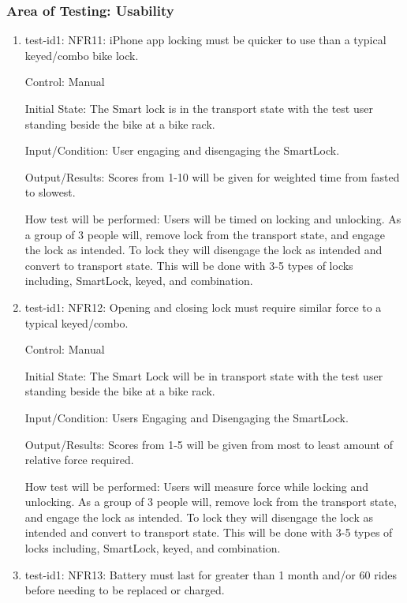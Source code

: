 \documentclass[12pt, titlepage]{article}
\begin{document}
\subsubsection{Area of Testing: Usability}

\begin{enumerate}

\item{test-id1: NFR11: iPhone app locking must be quicker to use than a typical keyed/combo bike lock.  \\}

Control: Manual 

Initial State: The Smart lock is in the transport state with the test user standing beside the bike at a bike rack.

Input/Condition: User engaging and disengaging the SmartLock.

Output/Results: Scores from 1-10 will be given for weighted time from fasted to slowest.

How test will be performed: Users will be timed on locking and unlocking. As a group of 3 people will, remove lock from the transport state, and engage the lock as intended. To lock they will disengage the lock as intended and convert to transport state. This will be done with 3-5 types of locks including, SmartLock, keyed, and combination.

\item{test-id1: NFR12: Opening and closing lock must require similar force to a typical keyed/combo.  \\}

Control: Manual 

Initial State: The Smart Lock will be in transport state with the test user standing beside the bike at a bike rack.

Input/Condition: Users Engaging and Disengaging the SmartLock.

Output/Results: Scores from 1-5 will be given from most to least amount of relative force required.

How test will be performed: Users will measure force while locking and unlocking. As a group of 3 people will, remove lock from the transport state, and engage the lock as intended. To lock they will disengage the lock as intended and convert to transport state. This will be done with 3-5 types of locks including, SmartLock, keyed, and combination.

\item{test-id1: NFR13: Battery must last for greater than 1 month and/or 60 rides before needing to be replaced or charged.  \\}


\end{enumerate}
\end{document}
